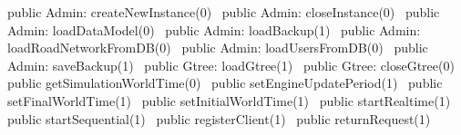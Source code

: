 public \LA{}Admin: createNewInstance(0)~{\nwtagstyle{}}\RA{}
public \LA{}Admin: closeInstance(0)~{\nwtagstyle{}}\RA{}
public \LA{}Admin: loadDataModel(0)~{\nwtagstyle{}}\RA{}
public \LA{}Admin: loadBackup(1)~{\nwtagstyle{}}\RA{}
public \LA{}Admin: loadRoadNetworkFromDB(0)~{\nwtagstyle{}}\RA{}
public \LA{}Admin: loadUsersFromDB(0)~{\nwtagstyle{}}\RA{}
public \LA{}Admin: saveBackup(1)~{\nwtagstyle{}}\RA{}
public \LA{}Gtree: loadGtree(1)~{\nwtagstyle{}}\RA{}
public \LA{}Gtree: closeGtree(0)~{\nwtagstyle{}}\RA{}
public \LA{}getSimulationWorldTime(0)~{\nwtagstyle{}}\RA{}
public \LA{}setEngineUpdatePeriod(1)~{\nwtagstyle{}}\RA{}
public \LA{}setFinalWorldTime(1)~{\nwtagstyle{}}\RA{}
public \LA{}setInitialWorldTime(1)~{\nwtagstyle{}}\RA{}
public \LA{}startRealtime(1)~{\nwtagstyle{}}\RA{}
public \LA{}startSequential(1)~{\nwtagstyle{}}\RA{}
public \LA{}registerClient(1)~{\nwtagstyle{}}\RA{}
public \LA{}returnRequest(1)~{\nwtagstyle{}}\RA{}
\nwendcode{}\nwdocspar

